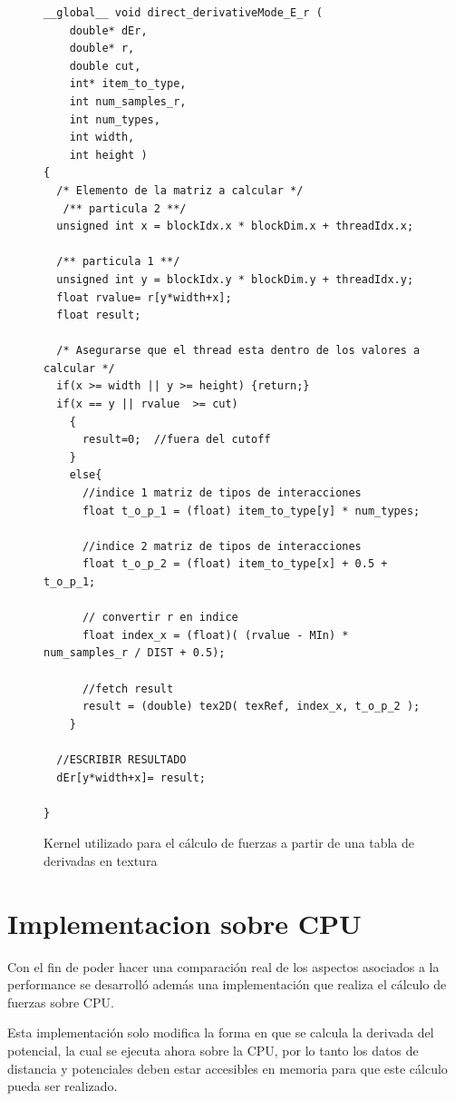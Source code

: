 \begin{figure}[htbp]
    \begin{lstlisting}
__global__ void direct_derivativeMode_E_r (
    double* dEr,
    double* r, 
    double cut, 
    int* item_to_type, 
    int num_samples_r, 
    int num_types, 
    int width, 
    int height )
{ 
  /* Elemento de la matriz a calcular */
   /** particula 2 **/
  unsigned int x = blockIdx.x * blockDim.x + threadIdx.x;
  
  /** particula 1 **/
  unsigned int y = blockIdx.y * blockDim.y + threadIdx.y;	
  float rvalue= r[y*width+x]; 
  float result;
  
  /* Asegurarse que el thread esta dentro de los valores a calcular */
  if(x >= width || y >= height) {return;}
  if(x == y || rvalue  >= cut) 
    {
      result=0;  //fuera del cutoff
    }
    else{
      //indice 1 matriz de tipos de interacciones
      float t_o_p_1 = (float) item_to_type[y] * num_types;	
      
      //indice 2 matriz de tipos de interacciones
      float t_o_p_2 = (float) item_to_type[x] + 0.5 + t_o_p_1;	
      
      // convertir r en indice
      float index_x = (float)( (rvalue - MIn) * num_samples_r / DIST + 0.5);	
     
      //fetch result
      result = (double) tex2D( texRef, index_x, t_o_p_2 );
    }
   
  //ESCRIBIR RESULTADO 
  dEr[y*width+x]= result;

}
    \end{lstlisting}
    \caption{Kernel utilizado para el cálculo de fuerzas a partir de una tabla de derivadas en textura}
    \label{code:potentialsKernel}
\end{figure}



\section{Implementacion sobre CPU}

Con el fin de poder hacer una comparación real de los aspectos asociados a la performance se desarrolló además una implementación que realiza el cálculo de fuerzas sobre CPU.

Esta implementación solo modifica la forma en que se calcula la derivada del potencial, la cual se ejecuta ahora sobre la CPU, por lo tanto los datos de distancia y potenciales deben estar accesibles en memoria para que este cálculo pueda ser realizado.
